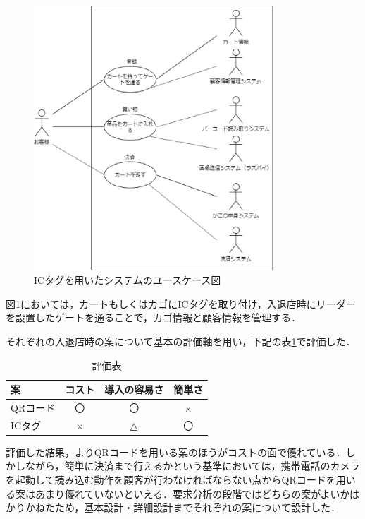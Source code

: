 \begin{figure}[htbp]
\centering
\includegraphics[width = 9cm]{./picture/usecase_ic.eps}
\caption{ICタグを用いたシステムのユースケース図}
\label{usecase_ic}
\end{figure}

図\ref{usecase_ic}においては，カートもしくはカゴにICタグを取り付け，入退店時にリーダーを設置したゲートを通ることで，カゴ情報と顧客情報を管理する．


それぞれの入退店時の案について基本の評価軸を用い，下記の表\ref{test}で評価した．


\begin{table}[htb]
\begin{center}
\caption{評価表}
\begin{tabular}{|l||c|c|c|} \hline
案 & コスト & 導入の容易さ & 簡単さ \\ \hline \hline
QRコード & 〇 & 〇 & × \\
ICタグ & × & △ & 〇 \\ \hline
\end{tabular}
\label{test}
  \end{center}
\end{table}


評価した結果，よりQRコードを用いる案のほうがコストの面で優れている．しかしながら，簡単に決済まで行えるかという基準においては，携帯電話のカメラを起動して読み込む動作を顧客が行わなければならない点からQRコードを用いる案はあまり優れていないといえる．要求分析の段階ではどちらの案がよいかはかりかねたため，基本設計・詳細設計までそれぞれの案について設計した．


